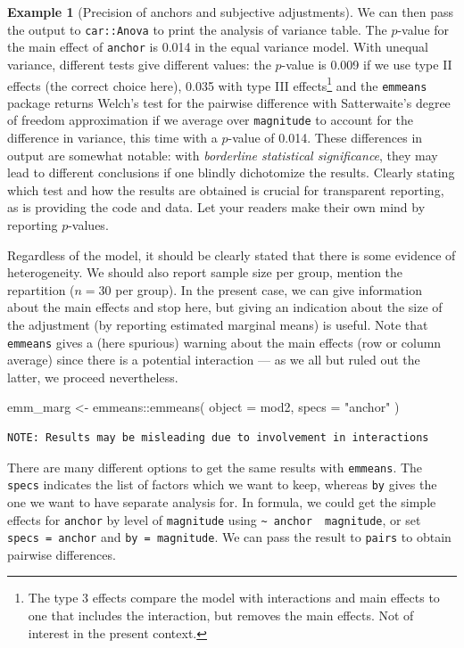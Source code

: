 \documentclass[
  11pt,
  letterpaper,
]{scrbook}
\newenvironment{Shaded}{\begin{snugshade}}{\end{snugshade}}
\newcommand{\AttributeTok}[1]{\textcolor[rgb]{0.40,0.45,0.13}{#1}}
\newcommand{\FunctionTok}[1]{\textcolor[rgb]{0.28,0.35,0.67}{#1}}
\newcommand{\NormalTok}[1]{\textcolor[rgb]{0.00,0.23,0.31}{#1}}
\newcommand{\OtherTok}[1]{\textcolor[rgb]{0.00,0.23,0.31}{#1}}
\newcommand{\SpecialCharTok}[1]{\textcolor[rgb]{0.37,0.37,0.37}{#1}}
\newcommand{\StringTok}[1]{\textcolor[rgb]{0.13,0.47,0.30}{#1}}
\theoremstyle{definition}
\newtheorem{example}{Example}[chapter]
\theoremstyle{definition}
\theoremstyle{remark}
\begin{document}
\begin{example}[Precision of anchors and subjective
adjustments]
We can then pass the output to \texttt{car::Anova} to print the analysis
of variance table. The \(p\)-value for the main effect of
\texttt{anchor} is 0.014 in the equal variance model. With unequal
variance, different tests give different values: the \(p\)-value is
0.009 if we use type II effects (the correct choice here), 0.035 with
type III effects\footnote{The type 3 effects compare the model with
  interactions and main effects to one that includes the interaction,
  but removes the main effects. Not of interest in the present context.}
and the \texttt{emmeans} package returns Welch's test for the pairwise
difference with Satterwaite's degree of freedom approximation if we
average over \texttt{magnitude} to account for the difference in
variance, this time with a \(p\)-value of 0.014. These differences in
output are somewhat notable: with \emph{borderline statistical
significance}, they may lead to different conclusions if one blindly
dichotomize the results. Clearly stating which test and how the results
are obtained is crucial for transparent reporting, as is providing the
code and data. Let your readers make their own mind by reporting
\(p\)-values.

Regardless of the model, it should be clearly stated that there is some
evidence of heterogeneity. We should also report sample size per group,
mention the repartition (\(n=30\) per group). In the present case, we
can give information about the main effects and stop here, but giving an
indication about the size of the adjustment (by reporting estimated
marginal means) is useful. Note that \texttt{emmeans} gives a (here
spurious) warning about the main effects (row or column average) since
there is a potential interaction --- as we all but ruled out the latter,
we proceed nevertheless.

\begin{Shaded}
\begin{Highlighting}[]
\NormalTok{emm\_marg }\OtherTok{\textless{}{-}}\NormalTok{ emmeans}\SpecialCharTok{::}\FunctionTok{emmeans}\NormalTok{(}
  \AttributeTok{object =}\NormalTok{ mod2,}
  \AttributeTok{specs =} \StringTok{"anchor"}
\NormalTok{)}
\end{Highlighting}
\end{Shaded}

\begin{verbatim}
NOTE: Results may be misleading due to involvement in interactions
\end{verbatim}

There are many different options to get the same results with
\texttt{emmeans}. The \texttt{specs} indicates the list of factors which
we want to keep, whereas \texttt{by} gives the one we want to have
separate analysis for. In formula, we could get the simple effects for
\texttt{anchor} by level of \texttt{magnitude} using
\texttt{\textasciitilde{}\ anchor\ \textbar{}\ magnitude}, or set
\texttt{specs\ =\ anchor} and \texttt{by\ =\ magnitude}. We can pass the
result to \texttt{pairs} to obtain pairwise differences.


\end{example}
\end{document}

